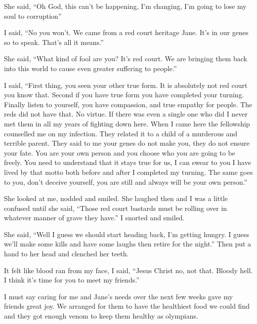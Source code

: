 She said, ``Oh God, this can't be happening, I'm changing, I'm going to lose my soul to corruption''

I said, ``No you won't. We came from a red court heritage Jane. It's in our genes so to speak. That's all it means.''

She said, ``What kind of fool are you? It's red court. We are bringing them back into this world to cause even greater suffering to people.''

I said, ``First thing, you seen your other true form. It is absolutely not red court you know that. Second if you have true form you have completed your turning. Finally listen to yourself, you have compassion, and true empathy for people. The reds did not have that. No virtue. If there was even a single one who did I never met them in all my years of fighting down here. When I came here the fellowship counselled me on my infection. They related it to a child of a murderous and terrible parent. They said to me your genes do not make you, they do not ensure your fate. You are your own person and you choose who you are going to be freely. You need to understand that it stays true for us, I can swear to you I have lived by that motto both before and after I completed my turning. The same goes to you, don't deceive yourself, you are still and always will be your own person.''

She looked at me, nodded and smiled. She laughed then and I was a little confused until she said, ``Those red court bastards must be rolling over in whatever manner of grave they have.'' I snorted and smiled.

She said, ``Well I guess we should start heading back, I'm getting hungry. I guess we'll make some kills and have some laughs then retire for the night.'' Then put a hand to her head and clenched her teeth.

It felt like blood ran from my face, I said, ``Jesus Christ no, not that. Bloody hell. I think it's time for you to meet my friends.''

I must say caring for me and Jane's needs over the next few weeks gave my friends great joy. We arranged for them to have the healthiest food we could find and they got enough venom to keep them healthy as olympians.

\parasep

